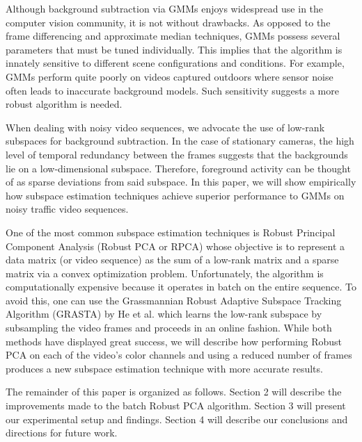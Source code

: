 \documentclass{article}
\begin{document}
Although background subtraction via GMMs enjoys widespread use in the computer vision community, it is not without drawbacks. As opposed to the frame differencing and approximate median techniques, GMMs possess several parameters that must be tuned individually. This implies that the algorithm is innately sensitive to different scene configurations and conditions. For example, GMMs perform quite poorly on videos captured outdoors where sensor noise often leads to inaccurate background models. Such sensitivity suggests a more robust algorithm is needed.


When dealing with noisy video sequences, we advocate the use of low-rank subspaces for background subtraction.  %
In the case of stationary cameras, the high level of temporal redundancy between the frames suggests that the backgrounds lie on a low-dimensional subspace. Therefore, foreground activity can be thought of as sparse deviations from said subspace. In this paper, we will show empirically how subspace estimation techniques achieve superior performance to GMMs on noisy traffic video sequences. 

One of the most common subspace estimation techniques is Robust Principal Component Analysis (Robust PCA or RPCA) \cite{RPCA09} whose objective is to represent a data matrix (or video sequence) as the sum of a low-rank matrix and a sparse matrix via a convex optimization problem. Unfortunately, the algorithm is computationally expensive because it operates in batch on the entire sequence. To avoid this, one can use the Grassmannian Robust Adaptive Subspace Tracking Algorithm (GRASTA) by He et al. \cite{GRASTA12} which learns the low-rank subspace by subsampling the video frames and proceeds in an online fashion. While both methods have displayed great success, we will describe how performing Robust PCA on each of the video's color channels and using a reduced number of frames produces a new subspace estimation technique with more accurate results. 


The remainder of this paper is organized as follows. Section 2 will describe the improvements made to the batch Robust PCA algorithm. Section 3 will present our experimental setup and findings. Section 4 will describe our conclusions and directions for future work.
\end{document}
